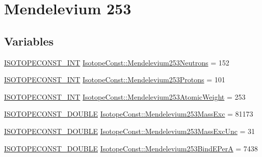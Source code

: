 \hypertarget{group___isotope_const-_mendelevium-_md253}{}\section{Mendelevium 253}
\label{group___isotope_const-_mendelevium-_md253}
\subsection*{Variables}
\begin{DoxyCompactItemize}
\item 
\mbox{\hyperlink{group___isotope_const-_macros_ga5f18360b3e99483a35c32d789e62621c}{I\+S\+O\+T\+O\+P\+E\+C\+O\+N\+S\+T\+\_\+\+I\+NT}} \mbox{\hyperlink{group___isotope_const-_mendelevium-_md253_ga85dea61391a3dc9cd6b190e19076dd2c}{Isotope\+Const\+::\+Mendelevium253\+Neutrons}} = 152
\item 
\mbox{\hyperlink{group___isotope_const-_macros_ga5f18360b3e99483a35c32d789e62621c}{I\+S\+O\+T\+O\+P\+E\+C\+O\+N\+S\+T\+\_\+\+I\+NT}} \mbox{\hyperlink{group___isotope_const-_mendelevium-_md253_ga0c4790cf1b040fbe8734a6c42f1949a9}{Isotope\+Const\+::\+Mendelevium253\+Protons}} = 101
\item 
\mbox{\hyperlink{group___isotope_const-_macros_ga5f18360b3e99483a35c32d789e62621c}{I\+S\+O\+T\+O\+P\+E\+C\+O\+N\+S\+T\+\_\+\+I\+NT}} \mbox{\hyperlink{group___isotope_const-_mendelevium-_md253_gad767e209ae58ad29291a59bb7af8e929}{Isotope\+Const\+::\+Mendelevium253\+Atomic\+Weight}} = 253
\item 
\mbox{\hyperlink{group___isotope_const-_macros_ga8f45a7272ce02c0b4c65c44636ed719a}{I\+S\+O\+T\+O\+P\+E\+C\+O\+N\+S\+T\+\_\+\+D\+O\+U\+B\+LE}} \mbox{\hyperlink{group___isotope_const-_mendelevium-_md253_ga3b80ed99c9fb742c68b2d0c778c11a41}{Isotope\+Const\+::\+Mendelevium253\+Mass\+Exc}} = 81173
\item 
\mbox{\hyperlink{group___isotope_const-_macros_ga8f45a7272ce02c0b4c65c44636ed719a}{I\+S\+O\+T\+O\+P\+E\+C\+O\+N\+S\+T\+\_\+\+D\+O\+U\+B\+LE}} \mbox{\hyperlink{group___isotope_const-_mendelevium-_md253_ga2af3f2f5b29bba3a17a2848839a8970a}{Isotope\+Const\+::\+Mendelevium253\+Mass\+Exc\+Unc}} = 31
\item 
\mbox{\hyperlink{group___isotope_const-_macros_ga8f45a7272ce02c0b4c65c44636ed719a}{I\+S\+O\+T\+O\+P\+E\+C\+O\+N\+S\+T\+\_\+\+D\+O\+U\+B\+LE}} \mbox{\hyperlink{group___isotope_const-_mendelevium-_md253_gae3269b59c67b62e663fab2999e9b5dae}{Isotope\+Const\+::\+Mendelevium253\+Bind\+E\+PerA}} = 7438
\item 

\end{DoxyCompactItemize}
